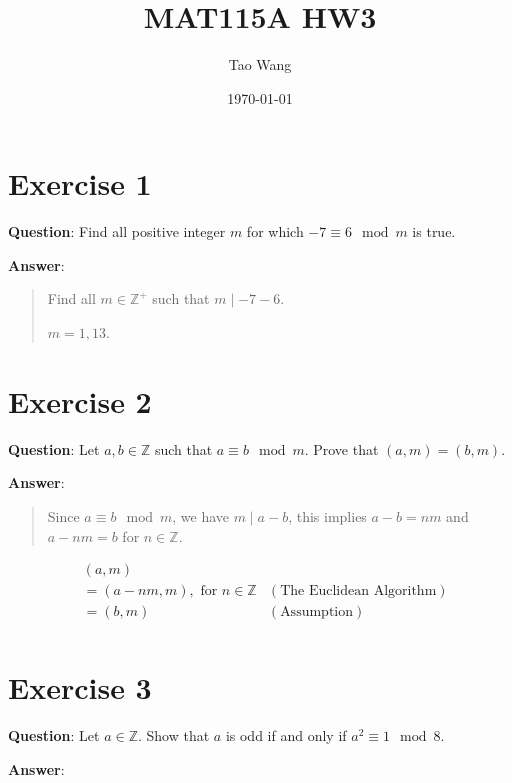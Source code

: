 \documentclass{article} %
\begin{document}
\title{MAT115A HW3}
\author{Tao Wang}
\date{\today}

\maketitle

\section*{Exercise 1}

\bigskip
\noindent
\textbf{Question}: Find all positive integer $m$ for which $-7 \equiv 6 \mod m$ is true.

\bigskip
\noindent
\textbf{Answer}:

\begin{quote}
    Find all $m \in \mathbb{Z}^+$ such that $m \mid -7 - 6$.

    $m = 1, 13$.
\end{quote}

\section*{Exercise 2}
\bigskip
\noindent
\textbf{Question}: Let $a, b \in \mathbb{Z}$ such that $a \equiv b \mod m$. Prove that $(a, m) = (b, m)$.

\bigskip
\noindent
\textbf{Answer}:
\begin{quote}

    Since $a \equiv b \mod m$, we have $m \mid a - b$, this implies $a - b = nm$ and $a - nm = b$ for $n \in \mathbb{Z}$.
\end{quote}
\begin{align*}
     & (a, m)                                       &                                  \\
     & = (a - nm, m), \text{ for } n \in \mathbb{Z} & (\text{The Euclidean Algorithm}) \\
     & = (b, m)                                     & (\text{Assumption})              \\
\end{align*}
\pagebreak
\section*{Exercise 3}
\bigskip
\noindent
\textbf{Question}: Let $a \in \mathbb{Z}$. Show that $a$ is odd if and only if $a^2 \equiv 1 \mod 8$.

\bigskip
\noindent
\textbf{Answer}:
\end{document}
